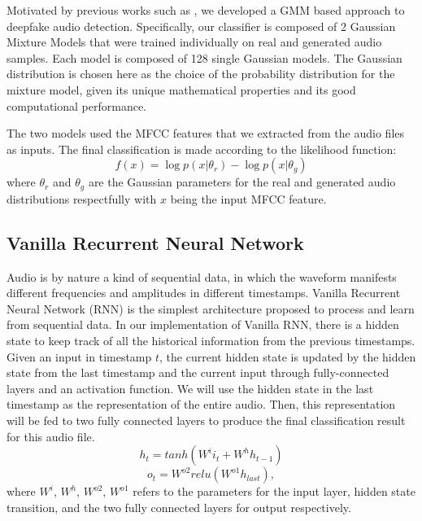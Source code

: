 \documentclass{article}
\begin{document}
Motivated by previous works such as \cite{spoofingdetection2020, AlluriV19-0, Bhushan2019}, we developed a GMM based approach to deepfake audio detection. Specifically, our classifier is composed of 2 Gaussian Mixture Models that were trained individually on real and generated audio samples. Each model is composed of 128 single Gaussian models. The Gaussian distribution is chosen here as the choice of the probability distribution for the mixture model, given its unique mathematical properties and its good computational performance.

The two models used the MFCC features that we extracted from the audio files as inputs. The final classification is made according to the likelihood function:
\begin{equation}
    f(x) = \log{p(x|\theta_r)} - \log{p(x|\theta_g)}
\end{equation}
where $\theta_r$ and $\theta_g$ are the Gaussian parameters for the real and generated audio distributions respectfully with $x$ being the input MFCC feature.

\subsection{Vanilla Recurrent Neural Network}

Audio is by nature a kind of sequential data, in which the waveform manifests different frequencies and amplitudes in different timestamps. Vanilla Recurrent Neural Network (RNN) is the simplest architecture proposed to process and learn from sequential data. In our implementation of Vanilla RNN, there is a hidden state to keep track of all the historical information from the previous timestamps. Given an input in timestamp $t$, the current hidden state is updated by the hidden state from the last timestamp and the current input through fully-connected layers and an activation function. We will use the hidden state in the last timestamp as the representation of the entire audio. Then, this representation will be fed to two fully connected layers to produce the final classification result for this audio file.
\begin{equation}
    h_t = tanh(W^i i_t + W^h h_{t-1})
\end{equation}
\begin{equation}
    o_t = W^{o2} relu(W^{o1} h_{last}),
\end{equation}
where $W^i$, $W^h$, $W^{o2}$, $W^{o1}$ refers to the parameters for the input layer, hidden state transition, and the two fully connected layers for output respectively.
\end{document}
